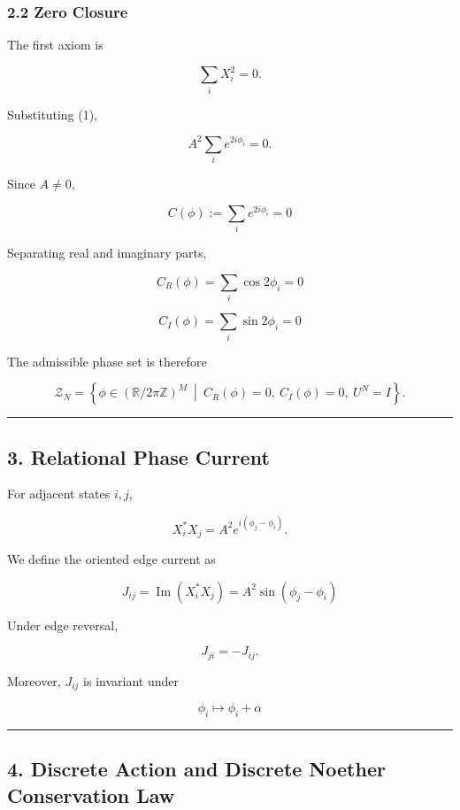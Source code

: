 \documentclass[
  a4paper,
]{article}
\begin{document}
\subsubsection{2.2 Zero Closure}\label{zero-closure}

The first axiom is

\[
\sum_iX_i^2=0.
\]

Substituting (1),

\[
A^2\sum_i e^{2i\phi_i}=0.
\]

Since \(A\neq0\),

\[
\boxed{
C(\phi)
:=
\sum_i e^{2i\phi_i}
=
0
}
\tag{2}
\]

Separating real and imaginary parts,

\[
\boxed{
C_R(\phi)
=
\sum_i\cos2\phi_i
=
0
}
\tag{3}
\]

\[
\boxed{
C_I(\phi)
=
\sum_i\sin2\phi_i
=
0
}
\tag{4}
\]

The admissible phase set is therefore

\[
\boxed{
\mathcal Z_N
=
\left\{
\phi
\in
(\mathbb R/2\pi\mathbb Z)^M
\ \middle|\
C_R(\phi)=0,
\ C_I(\phi)=0,
\ U^N=I
\right\}.
}
\tag{5}
\]

\begin{center}\rule{0.5\linewidth}{0.5pt}\end{center}

\subsection{3. Relational Phase Current}\label{relational-phase-current}

For adjacent states \(i,j\),

\[
X_i^*X_j
=
A^2e^{i(\phi_j-\phi_i)}.
\tag{6}
\]

We define the oriented edge current as

\[
\boxed{
J_{ij}
=
\operatorname{Im}(X_i^*X_j)
=
A^2\sin(\phi_j-\phi_i)
}
\tag{7}
\]

Under edge reversal,

\[
\boxed{
J_{ji}=-J_{ij}.
}
\tag{8}
\]

Moreover, \(J_{ij}\) is invariant under

\[
\phi_i\mapsto\phi_i+\alpha
\]

\begin{center}\rule{0.5\linewidth}{0.5pt}\end{center}

\subsection{4. Discrete Action and Discrete Noether Conservation
Law}\label{discrete-action-and-discrete-noether-conservation-law}
\end{document}
